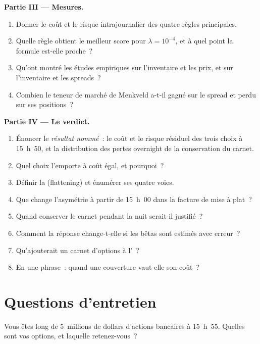 \begin{problem}
\medskip\noindent\textbf{Partie III --- Mesures.}
\begin{enumerate}[resume]
\item Donner le coût et le risque intrajournalier des quatre règles principales.
\item Quelle règle obtient le meilleur score pour $\lambda=10^{-4}$, et à quel point la formule est-elle proche~?
\item Qu'ont montré les études empiriques sur l'inventaire et les prix, et sur l'inventaire et les spreads~?
\item Combien le teneur de marché de Menkveld a-t-il gagné sur le spread et perdu sur ses positions~?
\end{enumerate}

\medskip\noindent\textbf{Partie IV --- Le verdict.}
\begin{enumerate}[resume]
\item Énoncer le \emph{résultat nommé}~: le coût et le risque résiduel des trois choix à 15~h~50, et la distribution des pertes overnight de la conservation du carnet.
\item Quel choix l'emporte à coût égal, et pourquoi~?
\item Définir la  (flattening) et énumérer ses quatre voies.
\item Que change l'asymétrie à partir de 15~h~00 dans la facture de mise à plat~?
\item Quand conserver le carnet pendant la nuit serait-il justifié~?
\item Comment la réponse change-t-elle si les bêtas sont estimés avec erreur~?
\item Qu'ajouterait un carnet d'options à l'~?
\item En une phrase~: quand une couverture vaut-elle son coût~?
\end{enumerate}
\end{problem}

\section{Questions d'entretien}

\begin{interviewq}\label{iq:hf:hedging-and-inventory-in-practice:1}
Vous êtes long de 5~millions de dollars d'actions bancaires à 15~h~55. Quelles sont vos options, et laquelle retenez-vous~?
\end{interviewq}

